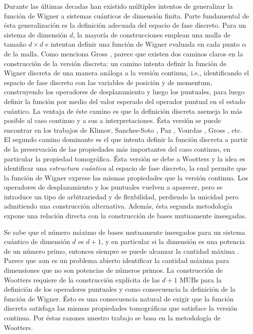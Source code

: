 \documentclass[a4paper,11pt]{report}
\begin{document}
  Durante las últimas decadas han existido múltiples
  intentos de generalizar la función de Wigner a sistemas
  cuánticos de dimensión finita. Parte fundamental de ésta
  generalización es la definición adecuada del espacio de
  fase discreto. Para un sistema de dimensión $d$, la
  mayoría de construcciones emplean una malla de tamaño $d
  \times d$ e intentan definir una función de Wigner
  evaluada en cada punto $\alpha$ de la malla. Como menciona
  Gross \cite{gross2005}, parece que existen dos caminos
  claros en la construcción de la versión discreta: un
  camino intenta definir la función de Wigner discreta de
  una manera análoga a la versión continua, i.e.,
  identificando el espacio de fase discreto con las
  variables de posición y de momentum, construyendo los
  operadores de desplazamiento y luego los puntuales, para
  luego definir la función por medio del valor esperado del
  operador puntual en el estado cuántico. La ventaja de éste
  camino es que la definición discreta asemeja lo más
  posible al caso continuo y a sus a interpretaciones. Ésta
  versión se puede encontrar en los trabajos de Klimov,
  Sanches-Soto \cite{klimov2005}, Paz \cite{paz}, Vourdas
  \cite{vourdas2005}, Gross \cite{gross2005}, etc. El
  segundo camino dominante es el que intenta definir la
  función discreta a partir de la preservación de las
  propiedades más importantes del caso continuo, en
  particular la propiedad tomográfica. Ésta versión se debe
  a Wootters \cite{gibbons2004} y la idea es identificar una
  \textit{estructura cuántica} al espacio de fase discreto,
  la cual permite que la función de Wigner exprese las
  mismas propiedades que la versión continua.  Los
  operadores de desplazamiento y los puntuales vuelven a
  aparecer, pero se introduce un tipo de arbitrariedad y de
  flexbilidad, perdiendo la unicidad pero admitiendo una
  construcción alternativa. Además, ésta segunda metodología
  expone una relación directa con la construcción de bases
  mutuamente insesgadas.

  Se sabe que el número máximo de bases mutuamente
  insesgados para un sistema cuántico de dimensión $d$ es
  $d+1$, y en particular si la dimensión es una potencia de
  un número primo, entonces siempre se puede alcanzar la
  cantidad máxima \cite{gibbons2004}. Parece que aun es un
  problema abierto identificar la cantidad máxima para
  dimensiones que no son potencias de números primos. La
  construcción de Wootters requiere de la construcción
  explícita de las $d+1$ MUBs para la definición de los
  operadores puntuales y como consecuencia la definición de
  la función de Wigner. Ésto es una consecuencia natural de
  exigir que la función discreta satisfaga las mismas
  propiedades tomográficas que satisface la versión
  continua. Por éstas razones nuestro trabajo se basa en la
  metodología de Wootters.
\end{document}
